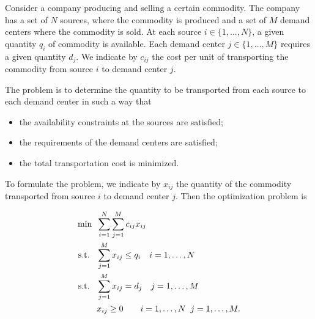 \documentclass[10pt,a4paper]{article}
\begin{document}
\begin{example}
Consider a company producing and selling a certain commodity. The company has a set of $N$ sources, where the commodity is produced and a set of $M$ demand centers where the commodity is sold. At each source $i \in \{1, \dots, N\}$, a given quantity $q_i$ of commodity is available. Each demand center $j \in \{1, \dots, M\}$ requires a given quantity $d_j$. We indicate by $c_{ij}$ the cost per unit of transporting the commodity from source $i$ to demand center $j$.

\par The problem is to determine the quantity to be transported from each source to
each demand center in such a way that
\begin{itemize}
	\item the availability constraints at the sources are satisfied;
	\item the requirements of the demand centers are satisfied;
	\item the total transportation cost is minimized.
\end{itemize}
To formulate the problem, we indicate by $x_{ij}$ the quantity of the commodity transported from source $i$ to demand center $j$. Then the optimization problem is

\begin{equation*}
	\begin{split}
		\min \;\; &\sum_{i=1}^{N}\sum_{j=1}^{M}c_{ij}x_{ij}\\
		\text{s.t.} \;\;\;&\sum_{j=1}^{M}x_{ij} \leq q_i\quad i=1, \dots, N\\
		\text{s.t.} \;\;\;&\sum_{j=1}^{M}x_{ij} = d_j\quad j=1, \dots, M\\
		& x_{ij} \geq 0 \quad \quad i=1, \dots, N\;\;j=1, \dots, M.
	\end{split}
\end{equation*}
\end{example}
\end{document}
